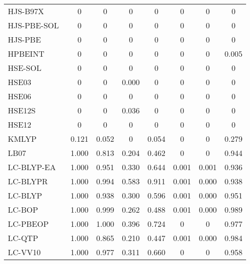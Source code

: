 \begin{table}
\begin{tabular}{|l|c|c|c|c|c|c|c|}
HJS-B97X~\cite{Henderson2008_194105} & 0 & 0 & 0 & 0 & 0 & 0 & 0 \\
HJS-PBE-SOL~\cite{Henderson2008_194105} & 0 & 0 & 0 & 0 & 0 & 0 & 0 \\
HJS-PBE~\cite{Henderson2008_194105} & 0 & 0 & 0 & 0 & 0 & 0 & 0 \\
HPBEINT~\cite{Fabiano2013_673} & 0 & 0 & 0 & 0 & 0 & 0 & 0.005 \\
HSE-SOL~\cite{Schimka2011_024116} & 0 & 0 & 0 & 0 & 0 & 0 & 0 \\
HSE03~\cite{Heyd2003_8207,Heyd2003_8207_err} & 0 & 0 & 0.000 & 0 & 0 & 0 & 0 \\
HSE06~\cite{Heyd2003_8207,Heyd2003_8207_err,Krukau2006_224106} & 0 & 0 & 0 & 0 & 0 & 0 & 0 \\
HSE12S~\cite{Moussa2012_204117} & 0 & 0 & 0.036 & 0 & 0 & 0 & 0 \\
HSE12~\cite{Moussa2012_204117} & 0 & 0 & 0 & 0 & 0 & 0 & 0 \\
KMLYP~\cite{Kang2001_11040} & 0.121 & 0.052 & 0 & 0.054 & 0 & 0 & 0.279 \\
LB07~\cite{Livshits2007_2932} & 1.000 & 0.813 & 0.204 & 0.462 & 0 & 0 & 0.944 \\
LC-BLYP-EA~\cite{Anderson2017_1656,Tawada2004_8425} & 1.000 & 0.951 & 0.330 & 0.644 & 0.001 & 0.001 & 0.936 \\
LC-BLYPR~\cite{Ai2021_1207} & 1.000 & 0.994 & 0.583 & 0.911 & 0.001 & 0.000 & 0.938 \\
LC-BLYP~\cite{Tawada2004_8425} & 1.000 & 0.938 & 0.300 & 0.596 & 0.001 & 0.000 & 0.951 \\
LC-BOP~\cite{Song2007_154105} & 1.000 & 0.999 & 0.262 & 0.488 & 0.001 & 0.000 & 0.989 \\
LC-PBEOP~\cite{Tawada2004_8425} & 1.000 & 1.000 & 0.396 & 0.724 & 0 & 0 & 0.977 \\
LC-QTP~\cite{Haiduke2018_184106} & 1.000 & 0.865 & 0.210 & 0.447 & 0.001 & 0.000 & 0.984 \\
LC-VV10~\cite{Vydrov2010_244103} & 1.000 & 0.977 & 0.311 & 0.660 & 0 & 0 & 0.958 \\
\bottomrule
\end{tabular}
\end{table}
